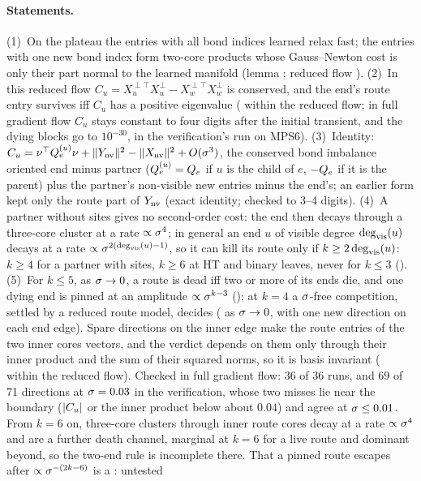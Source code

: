 \paragraph{Statements.}
(1)~On the plateau the entries with all bond indices learned relax fast; the entries with one new bond index form
two-core products whose Gauss--Newton cost is only their part normal to the learned manifold (lemma \proven; reduced
flow \derived). (2)~In this reduced flow $C_u=X_u^{\perp\top}X_u^\perp-X_w^{\perp\top}X_w^\perp$ is conserved, and the
end's route entry survives iff $C_u$ has a positive eigenvalue (\proven{} within the reduced flow; in full gradient
flow $C_u$ stays constant to four digits after the initial transient, and the dying blocks go to $10^{-30}$, in the
verification's run on MPS6). (3)~Identity: $C_u=\nu^{\top} Q^{(u)}_e\nu+\lVert Y_{\rm nv}\rVert^2-\lVert X_{\rm nv}\rVert^2+O(\sigma^3)$, the
conserved bond imbalance oriented end minus partner ($Q^{(u)}_e=Q_{e}$ if $u$ is the child of $e$, $-Q_{e}$ if it is the
parent) plus the partner's non-visible new entries minus the end's; an earlier
form kept only the route part of $Y_{\rm nv}$ (exact identity; checked to 3--4 digits). (4)~A partner without sites
gives no second-order cost: the end then decays through a three-core cluster at a rate $\propto\sigma^4$; in general an
end $u$ of visible degree $\deg_{\rm vis}(u)$ decays at a rate $\propto\sigma^{2(\deg_{\rm vis}(u)-1)}$, so it can kill its
route only if $k\ge2\deg_{\rm vis}(u)$: $k\ge4$ for
a partner with sites, $k\ge6$ at HT and binary leaves, never for $k\le3$ (\derived). (5)~For $k\le5$, as $\sigma\to0$, a
route is dead iff two or more of its ends die, and one dying end is pinned at an amplitude $\propto\sigma^{k-3}$
(\derived); at $k=4$ a $\sigma$-free competition, settled by a reduced route model, decides (\derived{} as $\sigma\to0$,
with one new direction on each end edge). Spare directions on the inner edge make the route entries of the two inner
cores vectors, and the verdict depends on them only through their inner product and the sum of their squared norms,
so it is basis invariant (\proven{} within the reduced flow). Checked in full gradient flow: 36 of 36 runs, and 69 of
71 directions at $\sigma=0.03$ in the verification, whose two misses lie near the boundary ($\lvert C_u\rvert$ or the inner
product below about $0.04$) and agree at $\sigma\le0.01$. From $k=6$ on, three-core clusters through inner route cores decay at a rate
$\propto\sigma^4$ and are a further death channel, marginal at $k=6$ for a live route and dominant beyond, so the
two-end rule is incomplete there. That a pinned route escapes after $\propto\sigma^{-(2k-6)}$ is a \conjecture: untested
